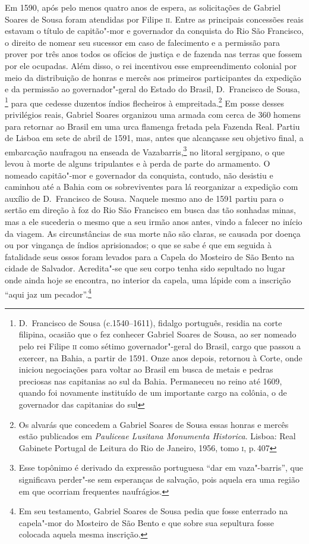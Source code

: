 \documentclass[12pt]{extarticle}
\begin{document}
{Em 1590, após pelo menos quatro anos de espera, as solicitações de
Gabriel Soares de Sousa foram atendidas por Filipe \textsc{ii}. Entre as
principais concessões reais estavam o título de capitão"-mor e
governador da conquista do Rio São Francisco, o direito de nomear seu
sucessor em caso de falecimento e a permissão para prover por três anos
todos os ofícios de justiça e de fazenda nas terras que fossem por ele
ocupadas. Além disso, o rei incentivou esse empreendimento colonial por
meio da distribuição de honras e mercês aos primeiros participantes da
expedição e da permissão ao governador"-geral do Estado do Brasil, D.~Francisco de Sousa,
\footnote{ D.~Francisco de Sousa (c.1540--1611),
fidalgo português, residia na corte filipina, ocasião que o fez
conhecer Gabriel Soares de Sousa, ao ser nomeado pelo rei Filipe \textsc{ii}
como sétimo governador"-geral do Brasil, cargo que passou a exercer, na
Bahia, a partir de 1591. Onze anos depois, retornou à Corte, onde
iniciou negociações para voltar ao Brasil em busca de metais e pedras
preciosas nas capitanias ao sul da Bahia. Permaneceu no reino até 1609,
quando foi novamente instituído de um importante cargo na colônia, o de
governador das capitanias do sul} para que cedesse duzentos índios
flecheiros à empreitada.\footnote{ Os alvarás que concedem a Gabriel
Soares de Sousa essas honras e mercês estão publicados em \textit{
Pauliceae Lusitana Monumenta Historica}. Lisboa: Real Gabinete Portugal
de Leitura do Rio de Janeiro, 1956, tomo \textsc{i}, p.\,407} Em posse
desses privilégios reais, Gabriel Soares organizou uma armada com cerca
de 360 homens para retornar ao Brasil em uma urca
flamenga fretada pela Fazenda Real. Partiu de Lisboa em sete de abril
de 1591, mas, antes que alcançasse seu objetivo final, a embarcação
naufragou na enseada de Vazabarris,\footnote{ Esse topônimo é derivado
da expressão portuguesa “dar em vaza"-barris”, que significava perder"-se
sem esperanças de salvação, pois aquela era uma região em que ocorriam
frequentes naufrágios.} no litoral sergipano, o que levou à morte de
alguns tripulantes e à perda de parte do armamento. O nomeado
capitão"-mor e governador da conquista, contudo, não desistiu e caminhou
até a Bahia com os sobreviventes para lá reorganizar a expedição com
auxílio de D.~Francisco de Sousa. Naquele mesmo ano de 1591 partiu para
o sertão em direção à foz do Rio São Francisco em busca das tão
sonhadas minas, mas a ele sucederia o mesmo que a seu irmão anos antes,
vindo a falecer no início da viagem. As circunstâncias de sua morte não
são claras, se causada por doença ou por vingança de índios
aprisionados; o que se sabe é que em seguida à fatalidade seus ossos
foram levados para a Capela do Mosteiro de São Bento na cidade de
Salvador. Acredita"-se que seu corpo tenha sido sepultado no lugar onde
ainda hoje se encontra, no interior da capela, uma lápide com a
inscrição ``aqui jaz um pecador''.\footnote{Em seu
testamento, Gabriel Soares de Sousa pedia que fosse enterrado na 
capela"-mor do Mosteiro de São Bento e que sobre sua sepultura fosse colocada
aquela mesma inscrição.}

}
\end{document}
